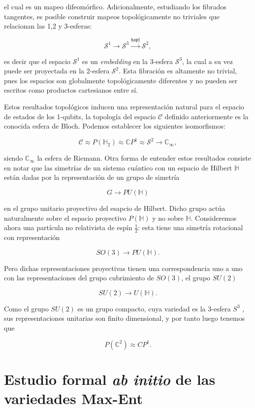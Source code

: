 \documentclass{report} %
\numberwithin{equation}{section}
\begin{document}
el cual es un mapeo difeomórfico. Adicionalmente, estudiando los fibrados tangentes,
es posible construir mapeos topológicamente no triviales que relacionan las 1,2 y 3-esferas:

$$
\mathcal{S}^{1} \rightarrow \mathcal{S}^{3} \xrightarrow{{\mathfrak{hopf}}} \mathcal{S}^{2},
$$

es decir que el espacio $\mathcal{S}^{1}$ es un \textit{embedding} en la 3-esfera $\mathcal{S}^{3}$, la cual a su vez puede ser proyectada en la 2-esfera $\mathcal{S}^{2}$. Esta fibración es altamente no trivial, pues los espacios son globalmente topológicamente diferentes y no pueden ser escritos como productos cartesianos entre sí. 

Estos resultados topológicos inducen una representación natural para el espacio de estados de los 1-qubits, la topología del espacio $\mathcal{C}$ definido anteriormente es la conocida esfera de Bloch. Podemos establecer los siguientes isomorfismos:

$$
\mathcal{C} \approx P(\mathds{H}_{2}) \approx \mathds{C}P^{1} \approx \mathcal{S}^{2} \rightarrow \mathds{C}_{\infty},
$$

siendo $\mathds{C}_{\infty}$ la esfera de Riemann. Otra forma de entender estos resultados consiste en notar que las simetrías de un sistema cuántico con un espacio de Hilbert $\mathds{H}$ están dadas por la representación de un grupo de simetría 

$$
G \rightarrow PU(\mathds{H})
$$

en el grupo unitario proyectivo del esapcio de Hilbert. Dicho grupo actúa naturalmente sobre el espacio proyectivo $P(\mathds{H})$ y no sobre $\mathds{H}$. Consideremos ahora una partícula no relativista de espín $\frac{1}{2}$: esta tiene una simetría rotacional con representación

$$
SO(3) \rightarrow PU(\mathds{H}).
$$

Pero dichas representaciones proyectivas tienen una correspondencia uno a uno con las representaciones del grupo cubrimiento de $SO(3)$, el grupo $SU(2)$

$$ 
SU(2) \rightarrow U(\mathds{H}). 
$$

Como el grupo $SU(2)$ es un grupo compacto, cuya variedad es la 3-esfera $S^3$ \cite{HoracioI}, sus representaciones unitarias son finito dimensional, y por tanto luego tenemos que 

$$
P(\mathds{C}^2) \approx CP^{1}.
$$

\section{Estudio formal \textit{ab initio} de las variedades Max-Ent}
\label{hausdorff}
\end{document}
